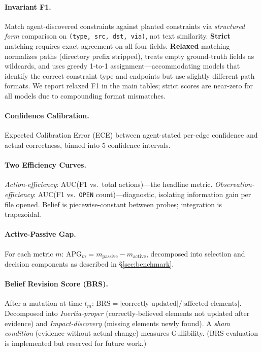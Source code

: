 \documentclass{article}
\begin{document}
\paragraph{Invariant F1.}
Match agent-discovered constraints against planted constraints via \emph{structured form} comparison on \texttt{(type, src, dst, via)}, not text similarity. \textbf{Strict} matching requires exact agreement on all four fields. \textbf{Relaxed} matching normalizes paths (directory prefix stripped), treats empty ground-truth fields as wildcards, and uses greedy 1-to-1 assignment---accommodating models that identify the correct constraint type and endpoints but use slightly different path formats. We report relaxed F1 in the main tables; strict scores are near-zero for all models due to compounding format mismatches.

\paragraph{Confidence Calibration.}
Expected Calibration Error (ECE) between agent-stated per-edge confidence and actual correctness, binned into 5 confidence intervals.

\paragraph{Two Efficiency Curves.}
\emph{Action-efficiency}: AUC(F1 vs.\ total actions)---the headline metric. \emph{Observation-efficiency}: AUC(F1 vs.\ \texttt{OPEN} count)---diagnostic, isolating information gain per file opened. Belief is piecewise-constant between probes; integration is trapezoidal.

\paragraph{Active-Passive Gap.}
For each metric $m$: $\text{APG}_m = m_\text{passive} - m_\text{active}$, decomposed into selection and decision components as described in \S\ref{sec:benchmark}.

\paragraph{Belief Revision Score (BRS).}
After a mutation at time $t_m$: $\text{BRS} = |\text{correctly updated}| / |\text{affected elements}|$. Decomposed into \emph{Inertia-proper} (correctly-believed elements not updated after evidence) and \emph{Impact-discovery} (missing elements newly found). A \emph{sham condition} (evidence without actual change) measures Gullibility. (BRS evaluation is implemented but reserved for future work.)
\end{document}
